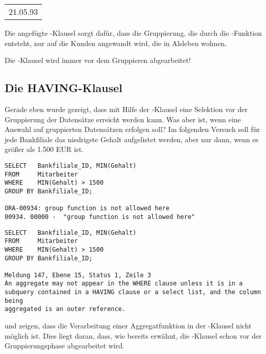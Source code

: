 \begin{center}
    \begin{small}
        \tablehead{}
        \begin{msoraclesql}
            \begin{supertabular}{l}
                21.05.93 \\
            \end{supertabular}
        \end{msoraclesql}
    \end{small}
\end{center}
Die angefügte \WHERE-Klausel sorgt dafür, dass die Gruppierung, die durch die -Funktion entsteht, nur auf die Kunden angewandt wird, die in Alsleben wohnen.

\begin{merke}
    Die \WHERE-Klausel wird immer vor dem Gruppieren abgearbeitet!
\end{merke}
\subsection{Die HAVING-Klausel}
Gerade eben wurde gezeigt, dass mit Hilfe der \WHERE-Klausel eine Selektion vor der Gruppierung der Datensätze erreicht werden kann. Was aber ist, wenn eine Auswahl auf gruppierten Datensätzen erfolgen soll? Im folgenden Versuch soll für jede Bankfiliale das niedrigste Gehalt aufgelistet werden, aber nur dann, wenn es größer als 1.500 EUR ist.
\begin{lstlisting}[language=oracle_sql,caption={Ein Versuch\dots mit Oracle},label=sql05_16]
SELECT   Bankfiliale_ID, MIN(Gehalt)
FROM     Mitarbeiter
WHERE    MIN(Gehalt) > 1500
GROUP BY Bankfiliale_ID;

ORA-00934: group function is not allowed here
00934. 00000 -  "group function is not allowed here"
        \end{lstlisting}
\clearpage
\begin{lstlisting}[language=ms_sql,caption={Der gleiche Versuch\dots mit MS SQL Server},label=sql05_17]
SELECT   Bankfiliale_ID, MIN(Gehalt)
FROM     Mitarbeiter
WHERE    MIN(Gehalt) > 1500
GROUP BY Bankfiliale_ID;

Meldung 147, Ebene 15, Status 1, Zeile 3
An aggregate may not appear in the WHERE clause unless it is in a
subquery contained in a HAVING clause or a select list, and the column being
aggregated is an outer reference.
        \end{lstlisting}
 und  zeigen, dass die Verarbeitung einer Aggregatfunktion in der \WHERE-Klausel nicht möglich ist. Dies liegt daran, dass, wie bereits erwähnt, die \WHERE-Klausel schon vor der Gruppierungsphase abgearbeitet wird.

